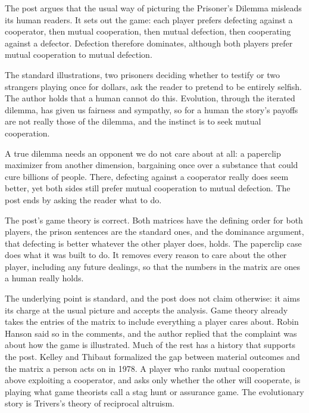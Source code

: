 \begin{afterword}
\summaryhead

The post argues that the usual way of picturing the Prisoner's Dilemma misleads its human readers. It sets out the game: each player prefers defecting against a cooperator, then mutual cooperation, then mutual defection, then cooperating against a defector. Defection therefore dominates, although both players prefer mutual cooperation to mutual defection.

The standard illustrations, two prisoners deciding whether to testify or two strangers playing once for dollars, ask the reader to pretend to be entirely selfish. The author holds that a human cannot do this. Evolution, through the iterated dilemma, has given us fairness and sympathy, so for a human the story's payoffs are not really those of the dilemma, and the instinct is to seek mutual cooperation.

A true dilemma needs an opponent we do not care about at all: a paperclip maximizer from another dimension, bargaining once over a substance that could cure billions of people. There, defecting against a cooperator really does seem better, yet both sides still prefer mutual cooperation to mutual defection. The post ends by asking the reader what to do.

\responsehead

The post's game theory is correct. Both matrices have the defining order for both players, the prison sentences are the standard ones, and the dominance argument, that defecting is better whatever the other player does, holds. The paperclip case does what it was built to do. It removes every reason to care about the other player, including any future dealings, so that the numbers in the matrix are ones a human really holds.

The underlying point is standard, and the post does not claim otherwise: it aims its charge at the usual picture and accepts the analysis. Game theory already takes the entries of the matrix to include everything a player cares about. Robin Hanson said so in the comments, and the author replied that the complaint was about how the game is illustrated. Much of the rest has a history that supports the post. Kelley and Thibaut formalized the gap between material outcomes and the matrix a person acts on in 1978. A player who ranks mutual cooperation above exploiting a cooperator, and asks only whether the other will cooperate, is playing what game theorists call a stag hunt or assurance game. The evolutionary story is Trivers's theory of reciprocal altruism.


\end{afterword}
